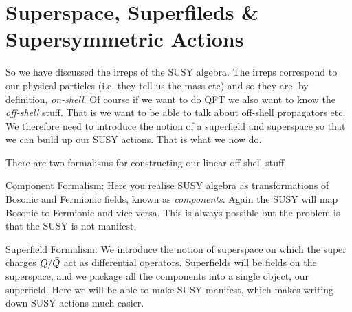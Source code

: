 \chapter{Superspace, Superfileds \& Supersymmetric Actions}

So we have discussed the irreps of the SUSY algebra. The irreps correspond to our physical particles (i.e. they tell us the mass etc) and so they are, by definition, \textit{on-shell}. Of course if we want to do QFT we also want to know the \textit{off-shell} stuff. That is we want to be able to talk about off-shell propagators etc. We therefore need to introduce the notion of a superfield and superspace so that we can build up our SUSY actions. That is what we now do.

There are two formalisms for constructing our linear off-shell stuff 
\ben 
    \item Component Formalism: Here you realise SUSY algebra as transformations of Bosonic and Fermionic fields, known as \textit{components}. Again the SUSY will map Bosonic to Fermionic and vice versa. This is always possible but the problem is that the SUSY is not manifest. 
    \item Superfield Formalism: We introduce the notion of superspace on which the super charges $Q/\Bar{Q}$ act as differential operators. Superfields will be fields on the superspace, and we package all the components into a single object, our superfield. Here we will be able to make SUSY manifest, which makes writing down SUSY actions much easier.
\een 

